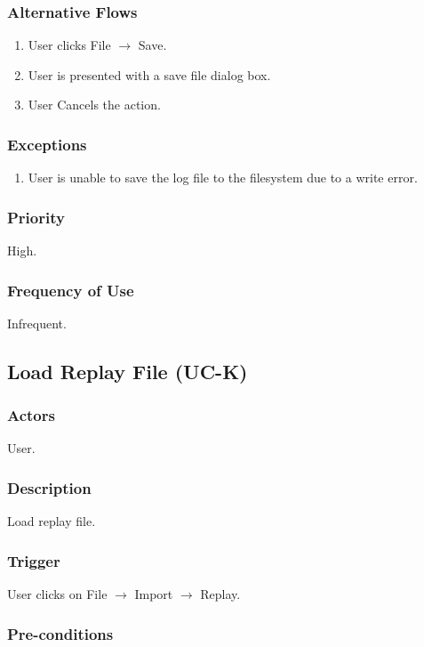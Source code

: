 \documentclass[a4paper,11pt,titlepage]{article}
\newcommand{\ra}{
  $\rightarrow$ \xspace
}
\begin{document}
\subsubsection{Alternative Flows}

\begin{enumerate}
  \item User clicks File \ra Save.
  \item User is presented with a save file dialog box.
  \item User Cancels the action.
\end{enumerate}

\subsubsection{Exceptions}

\begin{enumerate}
  \item  User is unable to save the log file to the filesystem due to a write error.
\end{enumerate}

\subsubsection{Priority}
High.

\subsubsection{Frequency of Use}
Infrequent.


\subsection{Load Replay File (UC-K)}
\subsubsection{Actors}
User.
\subsubsection{Description}
Load replay file.
\subsubsection{Trigger}
User clicks on File \ra Import \ra Replay.
\subsubsection{Pre-conditions}
\end{document}

